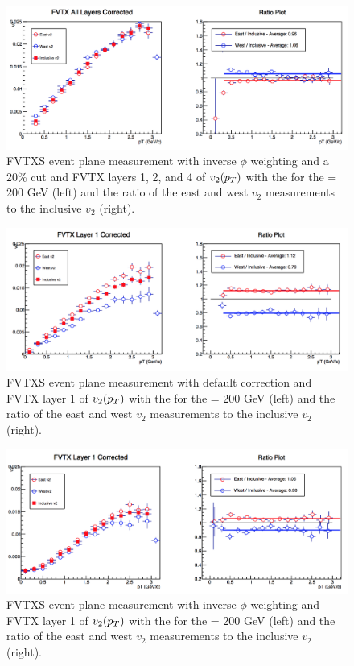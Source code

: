 \begin{figure}[!ht]
\centering
\includegraphics[width=0.65\linewidth]{figs/fvtx_all_data_cut.png}
\caption{FVTXS event plane measurement with inverse $\phi$ weighting and a 20\% cut and FVTX layers 1, 2, and 4 of $v_{2}(\mbox{$p_T$})$ with the  for the \pau \sqsn = 200 GeV (left) and the ratio of the east and west $v_2$ measurements to the inclusive $v_2$ (right).}
\end{figure}

\begin{figure}[!ht]
\centering
\includegraphics[width=0.65\linewidth]{figs/fvtx_1_default.png}
\caption{FVTXS event plane measurement with default correction and FVTX layer 1 of $v_{2}(\mbox{$p_T$})$ with the  for the \pau \sqsn = 200 GeV (left) and the ratio of the east and west $v_2$ measurements to the inclusive $v_2$ (right).}
\end{figure}

\begin{figure}[!ht]
\centering
\includegraphics[width=0.65\linewidth]{figs/fvtx_1_data.png}
\caption{FVTXS event plane measurement with inverse $\phi$ weighting and FVTX layer 1 of $v_{2}(\mbox{$p_T$})$ with the  for the \pau \sqsn = 200 GeV (left) and the ratio of the east and west $v_2$ measurements to the inclusive $v_2$ (right).}
\end{figure}

